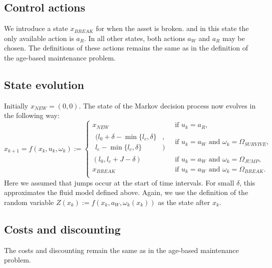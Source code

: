 \subsection{Control actions}
We introduce a state $x_{BREAK}$ for when the asset is broken.
and in this state the only available action is $a_R$.
In all other states, both actions $a_W$ and $a_R$ may be chosen.
The definitions of these actions remains the same as in the definition of the age-based maintenance problem.

\subsection{State evolution}
Initially $x_{NEW}=(0,0)$.
The state of the Markov decision process now evolves in the following way:
\[
x_{k+1}=f(x_k, u_k, \omega_k):=\begin{cases}
x_{NEW}&\ \text{if }u_k=a_R,\\
\begin{split}(l_0+\delta-\min\{l_c,\delta\}&,\\l_c-\min\{l_c,\delta\}&)\end{split}&\ \text{if }u_k=a_W\text{ and }\omega_k=\Omega_{SURVIVE},\\
(l_0,l_c+J-\delta)&\ \text{if }u_k=a_W\text{ and }\omega_k=\Omega_{JUMP},\\
x_{BREAK}&\ \text{if }u_k=a_W\text{ and }\omega_k=\Omega_{BREAK}.\\
\end{cases}
\]
Here we assumed that jumps occur at the start of time intervals.
For small $\delta$, this approximates the fluid model defined above.
Again, we use the definition of the random variable $Z(x_k):=f(x_k,a_W,\omega_k(x_k))$ as the state after $x_k$.

\subsection{Costs and discounting}
The costs and discounting remain the same as in the age-based maintenance problem.

